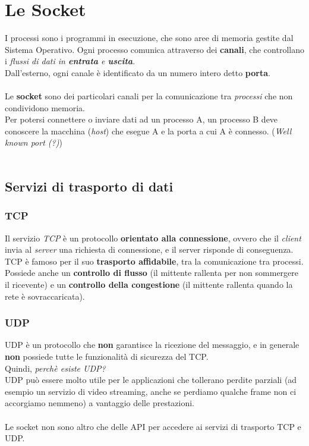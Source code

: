 \documentclass[12pt, a4paper]{article}
\begin{document}
    \section{Le Socket}
    I processi sono i programmi in esecuzione, che sono aree di memoria gestite dal Sistema Operativo.
    Ogni processo comunica attraverso dei \textbf{canali},
    che controllano i \textit{flussi di dati in \textbf{entrata} e \textbf{uscita}}.
    \\Dall'esterno, ogni canale è identificato da un numero intero detto \textbf{porta}.
    \\\\
    Le \textbf{socket} sono dei particolari canali per la comunicazione tra \textit{processi} che non condividono memoria.
    \\Per potersi connettere o inviare dati ad un processo A, un processo B deve conoscere la macchina (\textit{host})
    che esegue A e la porta a cui A è connesso. (\textit{Well known port (?)})
    \\\\
    
    \subsection{Servizi di trasporto di dati}

    \subsubsection*{TCP}
    Il servizio \textit{TCP} è un protocollo \textbf{orientato alla connessione}, ovvero 
    che il \textit{client} invia al \textit{server} una richiesta di connessione, e il server
    risponde di conseguenza.
    \\TCP è famoso per il suo \textbf{trasporto affidabile}, tra la comunicazione tra processi.
    \\Possiede anche un \textbf{controllo di flusso} (il mittente rallenta per non sommergere il ricevente)
    e un \textbf{controllo della congestione} (il mittente rallenta quando la rete è sovraccaricata).
     
    \subsubsection*{UDP}
    UDP è un protocollo che \textbf{non} garantisce la ricezione del messaggio, e 
    in generale \textbf{non} possiede tutte le funzionalità di sicurezza del TCP.
    \\Quindi, \textit{perchè esiste UDP?}
    \\UDP può essere molto utile per le applicazioni che tollerano perdite parziali
    (ad esempio un servizio di video streaming, anche se perdiamo qualche frame non ci accorgiamo nemmeno)
    a vantaggio delle prestazioni.
    \\\\
    Le socket non sono altro che delle API per accedere ai servizi di trasporto TCP e UDP.
    \\\\
\end{document}
